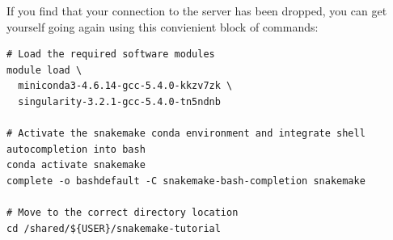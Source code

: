If you find that your connection to the server has been dropped, you can get yourself going again using this convienient block of commands:

\begin{lstlisting}
# Load the required software modules
module load \
  miniconda3-4.6.14-gcc-5.4.0-kkzv7zk \
  singularity-3.2.1-gcc-5.4.0-tn5ndnb

# Activate the snakemake conda environment and integrate shell autocompletion into bash
conda activate snakemake
complete -o bashdefault -C snakemake-bash-completion snakemake

# Move to the correct directory location
cd /shared/${USER}/snakemake-tutorial
\end{lstlisting}
